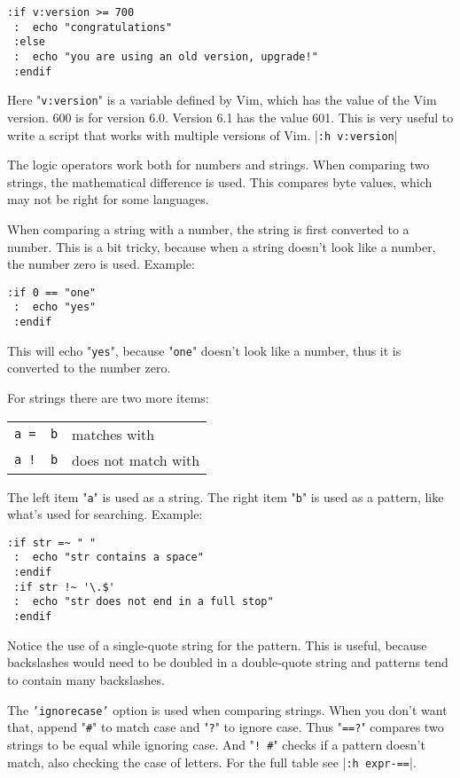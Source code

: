 \begin{Verbatim}[samepage=true]
 :if v:version >= 700
 :  echo "congratulations"
 :else
 :  echo "you are using an old version, upgrade!"
 :endif
\end{Verbatim}

Here "\texttt{v:version}" is a variable defined by Vim, which has the value of the Vim version.
600 is for version 6.0.
Version 6.1 has the value 601.
This is very useful to write a script that works with multiple versions of Vim.
|\texttt{:h v:version}|

The logic operators work both for numbers and strings.
When comparing two strings, the mathematical difference is used.
This compares byte values, which may not be right for some languages.

When comparing a string with a number, the string is first converted to a number.
This is a bit tricky, because when a string doesn't look like a number, the number zero is used.
Example:

\begin{Verbatim}[samepage=true]
 :if 0 == "one"
 :  echo "yes"
 :endif
\end{Verbatim}

This will echo "\texttt{yes}", because "\texttt{one}" doesn't look like a number, thus it is converted to the number zero.

For strings there are two more items:
\begin{center} \begin{tabular}{c l}
				\texttt{a =~ b} & matches with \\
				\texttt{a !~ b} & does not match with \\
\end{tabular} \end{center}

The left item "\texttt{a}" is used as a string.
The right item "\texttt{b}" is used as a pattern, like what's used for searching.
Example:

\begin{Verbatim}[samepage=true]
 :if str =~ " "
 :  echo "str contains a space"
 :endif
 :if str !~ '\.$'
 :  echo "str does not end in a full stop"
 :endif
\end{Verbatim}

Notice the use of a single-quote string for the pattern.
This is useful, because backslashes would need to be doubled in a double-quote string and patterns tend to contain many backslashes.

The \texttt{'ignorecase'} option is used when comparing strings.
When you don't want that, append "\texttt{\#}" to match case and "\texttt{?}" to ignore case.
Thus "\texttt{==?}" compares two strings to be equal while ignoring case.
And "\texttt{!~\#}" checks if a pattern doesn't match, also checking the case of letters.
For the full table see |\texttt{:h expr-==}|.
